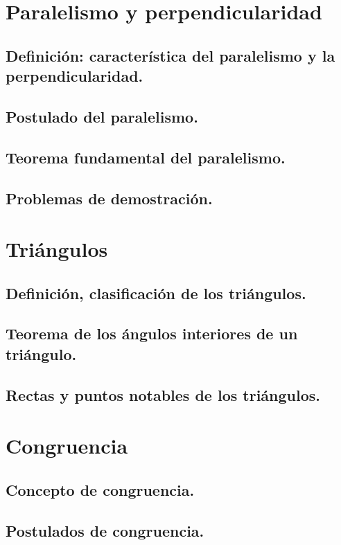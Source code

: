 \section{Paralelismo y perpendicularidad}%

\subsection{Definición: característica del paralelismo y la perpendicularidad.}
\subsection{Postulado del paralelismo.}
\subsection{Teorema fundamental del paralelismo.}
\subsection{Problemas de demostración. }


\section{Triángulos} %
\subsection{Definición, clasificación de los triángulos.}
\subsection{Teorema de los ángulos interiores de un triángulo.}
\subsection{Rectas y puntos notables de los triángulos. }


\section{Congruencia}%
\subsection{Concepto de congruencia.}
\subsection{Postulados de congruencia.}
